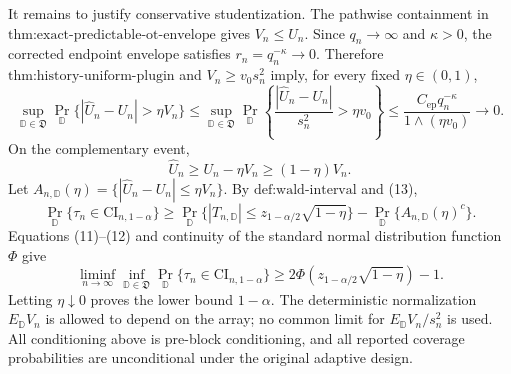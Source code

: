 It remains to justify conservative studentization. The pathwise containment in \(\text{thm:exact-predictable-ot-envelope}\) gives \(V_n\le U_n\). Since \(q_n\to\infty\) and \(\kappa>0\), the corrected endpoint envelope satisfies \(r_n=q_n^{-\kappa}\to0\). Therefore \(\text{thm:history-uniform-plugin}\) and \(V_n\ge v_0s_n^2\) imply, for every fixed \(\eta\in(0,1)\),
\[
\sup_{\mathbb D\in\mathfrak D}
\Pr_{\mathbb D}\{|\widehat U_n-U_n|>\eta V_n\}
\le
\sup_{\mathbb D\in\mathfrak D}
\Pr_{\mathbb D}\left\{\frac{|\widehat U_n-U_n|}{s_n^2}>\eta v_0\right\}
\le\frac{C_{\mathrm{ep}}q_n^{-\kappa}}{1\wedge(\eta v_0)}
\longrightarrow0. \tag{12}
\]
On the complementary event,
\[
\widehat U_n\ge U_n-\eta V_n\ge(1-\eta)V_n. \tag{13}
\]
Let \(A_{n,\mathbb D}(\eta)=\{|\widehat U_n-U_n|\le\eta V_n\}\). By \(\text{def:wald-interval}\) and (13),
\[
\Pr_{\mathbb D}\{\tau_n\in\mathrm{CI}_{n,1-\alpha}\}
\ge
\Pr_{\mathbb D}\{|T_{n,\mathbb D}|\le z_{1-\alpha/2}\sqrt{1-\eta}\}
-\Pr_{\mathbb D}\{A_{n,\mathbb D}(\eta)^c\}.
\]
Equations (11)--(12) and continuity of the standard normal distribution function \(\Phi\) give
\[
\liminf_{n\to\infty}\inf_{\mathbb D\in\mathfrak D}
\Pr_{\mathbb D}\{\tau_n\in\mathrm{CI}_{n,1-\alpha}\}
\ge2\Phi\!\left(z_{1-\alpha/2}\sqrt{1-\eta}\right)-1.
\tag{14}
\]
Letting \(\eta\downarrow0\) proves the lower bound \(1-\alpha\). The deterministic normalization \(E_{\mathbb D}V_n\) is allowed to depend on the array; no common limit for \(E_{\mathbb D}V_n/s_n^2\) is used. All conditioning above is pre-block conditioning, and all reported coverage probabilities are unconditional under the original adaptive design.